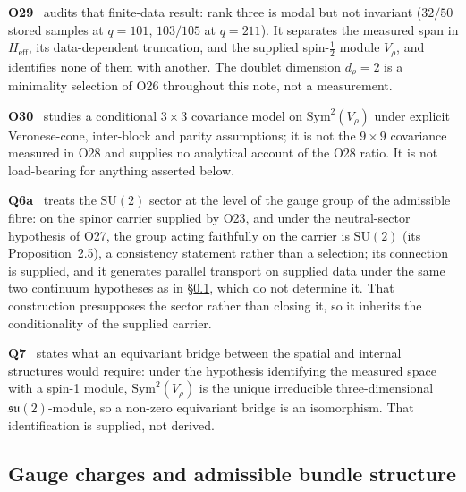 \documentclass[11pt,a4paper]{article}
\theoremstyle{definition}
\newcommand{\SU}{\mathrm{SU}}
\newcommand{\su}{\mathfrak{su}}
\newcommand{\Sym}{\mathrm{Sym}}
\begin{document}
      \textbf{O29}~\cite{Beau2026a33} audits that finite-data result: rank three is modal but not
      invariant ($32/50$ stored samples at $q=101$, $103/105$ at $q=211$).
      It separates the measured span in $H_{\mathrm{eff}}$, its data-dependent truncation, and the
      supplied spin-$\tfrac{1}{2}$ module $V_\rho$, and identifies none of them with another.
      The doublet dimension $d_\rho = 2$ is a minimality selection of O26 throughout this note, not
      a measurement.

      \textbf{O30}~\cite{Beau2026a34} studies a conditional $3\times3$ covariance model on
      $\Sym^2(V_\rho)$ under explicit Veronese-cone, inter-block and parity assumptions; it is not the
      $9\times9$ covariance measured in O28 and supplies no analytical account of the O28 ratio.
      It is not load-bearing for anything asserted below.

      \textbf{Q6a}~\cite{Beau2026q6a} treats the $\SU(2)$ sector at the level of the gauge group of the
      admissible fibre: on the spinor carrier supplied by O23, and under the neutral-sector
      hypothesis of O27, the group acting faithfully on the carrier is $\SU(2)$ (its
      Proposition~2.5), a consistency statement rather than a selection; its connection is supplied,
      and it generates parallel transport on supplied data under the same two continuum hypotheses as
      in §\ref{sec:charges}, which do not determine it.
      That construction presupposes the sector rather than closing it, so it inherits the
      conditionality of the supplied carrier.

      \textbf{Q7}~\cite{Beau2026q7} states what an equivariant bridge between the spatial and internal
      structures would require: under the hypothesis identifying the measured space with a spin-1
      module, $\Sym^2(V_\rho)$ is the unique irreducible three-dimensional $\su(2)$-module, so a
      non-zero equivariant bridge is an isomorphism.
      That identification is supplied, not derived.

    \subsection{Gauge charges and admissible bundle structure}
      \label{sec:charges}
\end{document}
